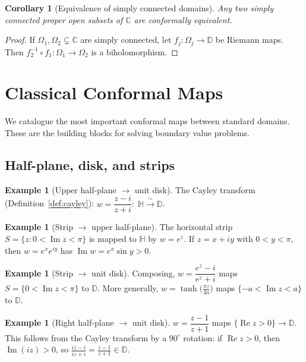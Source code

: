 \documentclass[12pt,a4paper,openany]{book}
\theoremstyle{definition}
\newtheorem{example}[definition]{Example}
\theoremstyle{plain}
\newtheorem{corollary}[definition]{Corollary}
\theoremstyle{remark}
\newcommand{\C}{\mathbb{C}}
\newcommand{\D}{\mathbb{D}}
\DeclareMathOperator{\re}{Re}
\DeclareMathOperator{\im}{Im}
\begin{document}
\begin{corollary}[Equivalence of simply connected domains]\label{cor:sc-equiv}
Any two simply connected proper open subsets of $\C$ are conformally
equivalent.
\end{corollary}

\begin{proof}
If $\Omega_1,\Omega_2\subsetneq\C$ are simply connected, let
$f_j\colon\Omega_j\to\D$ be Riemann maps.  Then
$f_2^{-1}\circ f_1\colon\Omega_1\to\Omega_2$ is a biholomorphism.
\end{proof}

\section{Classical Conformal Maps}\label{sec:classical-maps}

We catalogue the most important conformal maps between standard domains.
These are the building blocks for solving boundary value problems.

\subsection{Half-plane, disk, and strips}

\begin{example}[Upper half-plane $\to$ unit disk]\label{ex:H-to-D}
The Cayley transform (Definition~\ref{def:cayley}):
$w=\dfrac{z-i}{z+i}:\;\mathbb{H}\xrightarrow{\;\sim\;}\D$.
\end{example}

\begin{example}[Strip $\to$ upper half-plane]\label{ex:strip-to-H}
The horizontal strip $S=\{z:0<\im z<\pi\}$ is mapped to $\mathbb{H}$
by $w=e^z$.  If $z=x+iy$ with $0<y<\pi$, then $w=e^x e^{iy}$ has
$\im w=e^x\sin y>0$.
\end{example}

\begin{example}[Strip $\to$ unit disk]\label{ex:strip-to-D}
Composing, $w=\dfrac{e^z-i}{e^z+i}$ maps $S=\{0<\im z<\pi\}$ to $\D$.
More generally, $w=\tanh\!\bigl(\frac{\pi z}{4a}\bigr)$ maps
$\{-a<\im z<a\}$ to $\D$.
\end{example}

\begin{example}[Right half-plane $\to$ unit disk]\label{ex:right-hp-to-D}
$w=\dfrac{z-1}{z+1}$ maps $\{\re z>0\}\to\D$.  This follows from the
Cayley transform by a $90^\circ$ rotation: if $\re z>0$, then $\im(iz)>0$,
so $\frac{iz-i}{iz+i}=\frac{z-1}{z+1}\in\D$.
\end{example}
\end{document}
